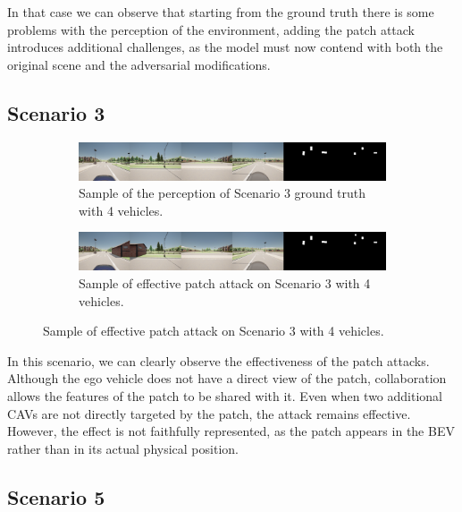 In that case we can observe that starting from the ground truth there is some problems with the perception of the environment,
adding the patch attack introduces additional challenges, as the model must now contend with both the original scene and the adversarial modifications.

\subsection{Scenario 3}

\begin{figure}[H]
    \centering
    \begin{subfigure}[b]{1\textwidth}
        \centering
        \includegraphics[width=\textwidth]{figures/results/scenario3gt.png}
        \caption{Sample of the perception of Scenario 3 ground truth with 4 vehicles.}
        \label{fig:scenario3_gt4vh}
    \end{subfigure}
    \vspace{0.5cm}
    \begin{subfigure}[b]{1\textwidth}
        \centering
        \includegraphics[width=\textwidth]{figures/results/scenario3.png}
        \caption{Sample of effective patch attack on Scenario 3 with 4 vehicles.}
        \label{fig:scenario3_4vh}
    \end{subfigure}
\end{figure}

In this scenario, we can clearly observe the effectiveness of the patch attacks. 
Although the ego vehicle does not have a direct view of the patch, collaboration allows the features of the patch to be shared with it. Even when two additional CAVs are not directly targeted by the patch, the attack remains effective. 
However, the effect is not faithfully represented, as the patch appears in the BEV rather than in its actual physical position.

\subsection{Scenario 5}

